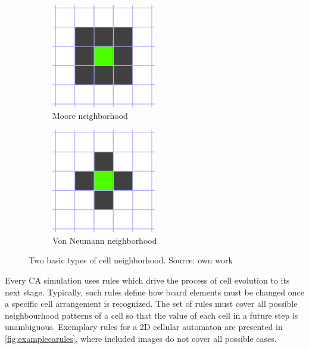 \documentclass[12pt]{report}
\begin{document}
\begin{figure}[h]
	\centering
	\begin{subfigure}[b]{0.4\textwidth}
		\centering
		\includegraphics[width=0.5\textwidth]{images/neighborsmoore}
		\caption{Moore neighborhood} 
	\end{subfigure}
	\hfill
	\begin{subfigure}[b]{0.4\textwidth}
		\centering
		\includegraphics[width=0.5\textwidth]{images/neighborsvonneumann}
		\caption{Von Neumann neighborhood} 
	\end{subfigure} 
	\caption{Two basic types of cell neighborhood. Source: own work}
	\label{fig:neighborhood_types}
\end{figure}


Every CA simulation uses rules which drive the process of cell evolution to its next stage. Typically, such rules define how board elements must be changed once a specific cell arrangement is recognized. The set of rules must cover all possible neighbourhood patterns of a cell so that the value of each cell in a future step is unambiguous. Exemplary rules for a 2D cellular automaton are presented in  \cref{fig:examplecarules}, where included images do not cover all possible cases.
\end{document}
